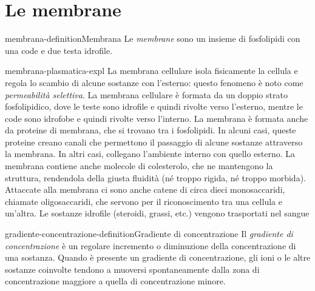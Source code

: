 \documentclass[preview]{standalone}
\begin{document}
\genpage

\section{Le membrane}



\begin{snippetdefinition}{membrana-definition}{Membrana}
    Le \textit{membrane} sono un insieme di fosfolipidi con una code e due testa idrofile.
\end{snippetdefinition}

\begin{snippet}{membrana-plasmatica-expl}
    La membrana cellulare isola fisicamente la cellula e regola lo scambio di alcune sostanze
    con l'esterno: questo fenomeno è noto come \textit{permeabilità selettiva}. La membrana cellulare
    è formata da un doppio strato fosfolipidico, dove le teste sono idrofile e quindi rivolte verso
    l'esterno, mentre le code sono idrofobe e quindi rivolte verso l'interno. La membrana è
    formata anche da proteine di membrana, che si trovano tra i fosfolipidi. In alcuni casi, queste
    proteine creano canali che permettono il passaggio di alcune sostanze attraverso la
    membrana. In altri casi, collegano l'ambiente interno con quello esterno. La membrana
    contiene anche molecole di colesterolo, che ne mantengono la struttura, rendendola della
    giusta fluidità (né troppo rigida, né troppo morbida). Attaccate alla membrana ci sono anche
    catene di circa dieci monosaccaridi, chiamate oligosaccaridi, che servono per il
    riconoscimento tra una cellula e un'altra.
    Le sostanze idrofile (steroidi, grassi, etc.) vengono trasportati nel sangue
\end{snippet}

\begin{snippetdefinition}{gradiente-concentrazione-definition}{Gradiente di concentrazione}
    Il \textit{gradiente di concentrazione} è un regolare incremento o diminuzione della concentrazione di una sostanza. Quando è presente un gradiente di concentrazione, gli ioni o le altre sostanze coinvolte tendono a muoversi spontaneamente dalla zona di concentrazione maggiore a quella di concentrazione minore.
\end{snippetdefinition}
\end{document}
